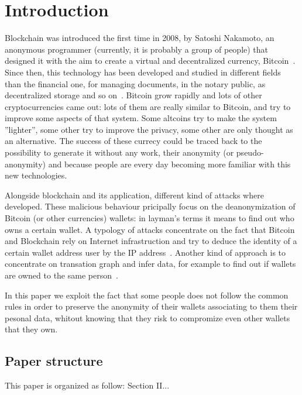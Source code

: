 \section{Introduction}
Blockchain was introduced the first time in 2008, by Satoshi Nakamoto, an
anonymous programmer (currently, it is probably a group of people) that
designed it with the aim to create a virtual and decentralized currency,
Bitcoin~\cite{satoshi}. Since then, this technology has been developed and
studied in different fields than the financial one, for managing documents, in
the notary public, as decentralized storage and so on~\cite{air}. Bitcoin grow
rapidly and lots of other cryptocurrencies came out: lots of them are really
similar to Bitcoin, and try to improve some aspects of that system. Some
altcoins try to make the system ''lighter'', some other try to improve the
privacy, some other are only thought as an alternative. The success of these
currecy could be traced back to the possibility to generate it without any work,
their anonymity (or pseudo-anonymity) and because people are every day becoming
more familiar with this new technologies.

Alongside blockchain and its application, different kind of attacks where
developed. These malicious behaviour pricipally focus on the deanonymization of
Bitcoin (or other currencies) wallets: in layman's terms it means to find out
who owns a certain wallet. A typology of attacks concentrate on the fact that
Bitcoin and Blockchain rely on Internet infrastruction and try to deduce the
identity of a certain wallet address user by the IP address~\cite{deanon}.
Another kind of approach is to concentrate on transation graph and infer data,
for example to find out if wallets are owned to the same person~\cite{fistful}.

In this paper we exploit the fact that some people does not follow the common
rules in order to preserve the anonymity of their wallets associating to them
their pesonal data, whitout knowing that they risk to compromize even other
wallets that they own.


\subsection{Paper structure}
This paper is organized as follow: Section II...
